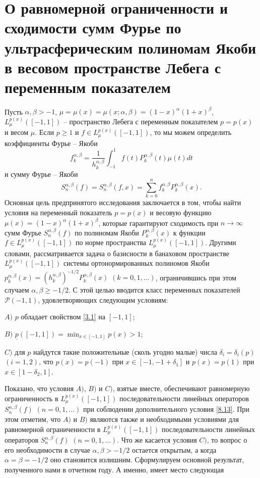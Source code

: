 \section{О равномерной ограниченности и сходимости сумм Фурье по ультрасферическим полиномам Якоби в весовом пространстве Лебега с переменным показателем }
Пусть $\alpha,\beta>-1$, $\mu=\mu(x)=\mu(x;\alpha,\beta) =(1-x)^\alpha(1+x)^\beta$, $L^{p(x)}_\mu([-1,1])$ -- пространство Лебега с переменным показателем $p=p(x)$ и весом $\mu$. Если $p\ge1$ и $f\in L^{p(x)}_\mu([-1,1])$, то мы можем определить коэффициенты Фурье -- Якоби
\begin{equation}\label{8.1}
f_k^{\alpha,\beta}=\frac{1}{h_k^{\alpha,\beta}}\int_{-1}^1f(t)P_k^{\alpha,\beta}(t)
\mu(t)dt
\end{equation}
и сумму Фурье -- Якоби
\begin{equation}\label{8.2}
S_n^{\alpha,\beta}(f)=S_n^{\alpha,\beta}(f,x)=\sum_{k=0}^nf_k^{\alpha,\beta}P_k^{\alpha,\beta}(x).
\end{equation}
Основная цель предпринятого исследования заключается в том, чтобы найти условия на переменный показатель $p=p(x)$ и весовую функцию $\mu(x) = (1-x)^\alpha (1+x)^\beta$, которые гарантируют сходимость при $n\to\infty$ сумм Фурье $S_n^{\alpha,\beta}(f)$ по полиномам Якоби $P_k^{\alpha,\beta}(x)$ к функции $f\in L^{p(x)}_\mu([-1,1])$ по норме пространства $L^{p(x)}_\mu([-1,1])$. Другими словами, рассматривается задача о базисности в банаховом пространстве $L^{p(x)}_\mu([-1,1])$ системы ортонормированных полиномов Якоби $p_k^{\alpha,\beta}(x)=(h_k^{\alpha,\beta})^{-1/2}P_k^{\alpha,\beta}(x)$ $(k=0,1,\ldots)$, ограничившись при этом случаем $\alpha, \beta\ge-1/2$.
С этой целью  вводится класс переменных показателей $\mathcal{ P}(-1,1)$, удовлетворяющих следующим условиям:

$A)$ $p$ обладает свойством \eqref{3.1} на $[-1,1]$;

$B)$  $\underline{p}([-1,1])=\min_{x\in [-1,1]}p(x)>1$;

$C)$ для $p$ найдутся такие  положительные (сколь угодно малые) числа $\delta_i=\delta_i(p)$ $(i=1,2)$, что $p(x)=p(-1)$ при $x\in[-1,-1+\delta_1]$ и $p(x)=p(1)$ при $x\in [1-\delta_2,1]$.


Показано, что условия $A)$, $B)$ и $C)$, взятые вместе, обеспечивают равномерную ограниченность в  $L^{p(x)}_\mu([-1,1])$ последовательности линейных операторов $S_n^{\alpha,\beta}(f)$ $(n=0,1,\ldots)$ при соблюдении дополнительного условия \eqref{8.13}.  При этом отметим, что  $A)$ и $B)$ являются также и необходимыми условиями для равномерной ограниченности в $L^{p(x)}_\mu([-1,1])$ последовательности линейных операторов $S_n^{\alpha,\beta}(f)$ $(n=0,1,\ldots)$. Что же касается условия $C)$, то вопрос о его необходимости в случае $\alpha,\beta>-1/2$ остается открытым, а когда $\alpha=\beta=-1/2$  оно становится излишним.
Сформулируем основной результат, полученного нами в отчетном году. А именно, имеет место следующая





